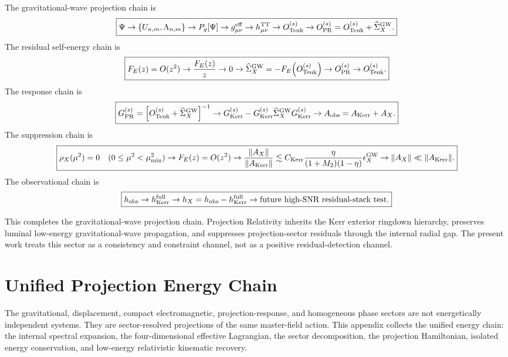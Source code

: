 \documentclass[11pt]{article}
\begin{document}
The gravitational-wave projection chain is
\begin{equation}
\boxed{
\Psi
\rightarrow
\{U_{n,m},\Lambda_{n,m}\}
\rightarrow
P_g[\Psi]
\rightarrow
g_{\mu\nu}^{\rm eff}
\rightarrow
h_{\mu\nu}^{\rm TT}
\rightarrow
O_{\rm Teuk}^{(s)}
\rightarrow
O_{\rm PR}^{(s)}
=
O_{\rm Teuk}^{(s)}
+
\widehat{\Sigma}_{X}^{\rm GW}.
}
\end{equation}
The residual self-energy chain is
\begin{equation}
\boxed{
F_E(z)=O(z^2)
\rightarrow
\frac{F_E(z)}{z}\rightarrow0
\rightarrow
\widehat{\Sigma}_{X}^{\rm GW}
=
-F_E\!\left(O_{\rm Teuk}^{(s)}\right)
\rightarrow
O_{\rm PR}^{(s)}
\rightarrow
O_{\rm Teuk}^{(s)}.
}
\end{equation}
The response chain is
\begin{equation}
\boxed{
G_{\rm PR}^{(s)}
=
\left[
O_{\rm Teuk}^{(s)}
+
\widehat{\Sigma}_{X}^{\rm GW}
\right]^{-1}
\rightarrow
G_{\rm Kerr}^{(s)}
-
G_{\rm Kerr}^{(s)}
\widehat{\Sigma}_{X}^{\rm GW}
G_{\rm Kerr}^{(s)}
\rightarrow
A_{\rm obs}
=
A_{\rm Kerr}
+
A_X.
}
\end{equation}
The suppression chain is
\begin{equation}
\boxed{
\rho_X(\mu^2)=0
\quad
(0\leq\mu^2<\mu_{\min}^2)
\rightarrow
F_E(z)=O(z^2)
\rightarrow
\frac{\|A_X\|}{\|A_{\rm Kerr}\|}
\lesssim
C_{\rm Kerr}
\frac{\eta}{(1+M_2)(1-\eta)}
\epsilon_X^{\rm GW}
\rightarrow
\|A_X\|\ll\|A_{\rm Kerr}\|.
}
\end{equation}
The observational chain is
\begin{equation}
\boxed{
h_{\rm obs}
\rightarrow
h_{\rm Kerr}^{\rm full}
\rightarrow
h_X
=
h_{\rm obs}
-
h_{\rm Kerr}^{\rm full}
\rightarrow
\text{future high-SNR residual-stack test}.
}
\end{equation}

This completes the gravitational-wave projection chain. Projection Relativity inherits the Kerr exterior ringdown hierarchy, preserves luminal low-energy gravitational-wave propagation, and suppresses projection-sector residuals through the internal radial gap. The present work treats this sector as a consistency and constraint channel, not as a positive residual-detection channel.

\section{Unified Projection Energy Chain}
\label{sec:unified_projection_energy_chain}

The gravitational, displacement, compact electromagnetic, projection-response,
and homogeneous phase sectors are not energetically independent systems. They
are sector-resolved projections of the same master-field action. This appendix
collects the unified energy chain: the internal spectral expansion, the
four-dimensional effective Lagrangian, the sector decomposition, the projection
Hamiltonian, isolated energy conservation, and low-energy relativistic
kinematic recovery.
\end{document}
